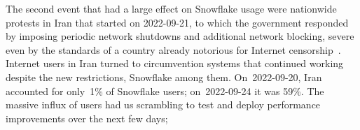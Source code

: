 \documentclass[letterpaper,twocolumn]{article}
\begin{document}
The second event that had a large effect on Snowflake usage
were nationwide protests in Iran that started on \mbox{2022-09-21},
to which the government responded by imposing periodic network shutdowns
and additional network blocking,
severe even by the standards of a country already notorious
for Internet censorship~\cite{ooni-2022-iran-blocks-social-media-mahsa-amini-protests}.
Internet users in Iran turned to circumvention systems
that continued working despite the new restrictions,
Snowflake among them.
On~\mbox{2022-09-20}, Iran accounted for only~1\% of Snowflake users;
on~\mbox{2022-09-24} it was 59\%.
The massive influx of users had us scrambling to test and deploy
performance improvements over the next few days;
\end{document}
